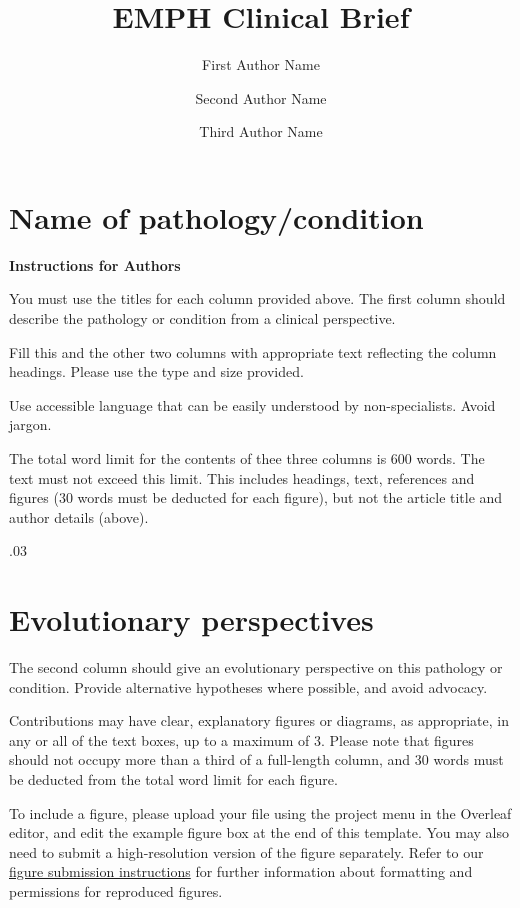\documentclass[fleqn]{wlemph}
\title{EMPH Clinical Brief}
\author[1]{First Author Name}
\author[2]{Second Author Name}
\author[3]{Third Author Name}
\affil[1]{First Author affiliation}
\affil[2]{Second Author affiliation}
\affil[3]{Third Author affiliation}
\begin{document}
\flushbottom
\maketitle
\thispagestyle{empty}
\noindent\begin{minipage}[t]{0.31333\textwidth}\setlength{\parindent}{15pt}

\section*{Name of pathology/condition}
\fontsize{9.5}{12}\selectfont

\textbf{Instructions for Authors}

You must use the titles for each column provided above. The first column should describe the pathology or condition from a clinical perspective.  

Fill this and the other two columns with appropriate text reflecting the column headings. Please use the type and size provided.

Use accessible language that can be easily understood by non-specialists. Avoid jargon. 

The total word limit for the contents of thee three columns is 600 words. The text must not exceed this limit. This includes headings, text, references and figures (30 words must be deducted for each figure), but not the article title and author details (above).

\end{minipage}%
\kern.03\textwidth%
\begin{minipage}[t]{0.31333\textwidth}\setlength{\parindent}{15pt}

\section*{Evolutionary perspectives}
\fontsize{9.5}{12}\selectfont

The second column should give an evolutionary perspective on this pathology or condition.  Provide alternative hypotheses where possible, and avoid advocacy.  
 
Contributions may have clear, explanatory figures or diagrams, as appropriate, in any or all of the text boxes, up to a maximum of 3. Please note that figures should not occupy more than a third of a full-length column, and 30 words must be deducted from the total word limit for each figure.

To include a figure, please upload your file using the project menu in the Overleaf editor, and edit the example figure box at the end of this template.  You may also need to submit a high-resolution version of the figure separately. Refer to our \href{http://www.oxfordjournals.org/for_authors/figures.html}{figure submission instructions} for further information about formatting and permissions for reproduced figures.

\end{minipage}%
\end{document}
